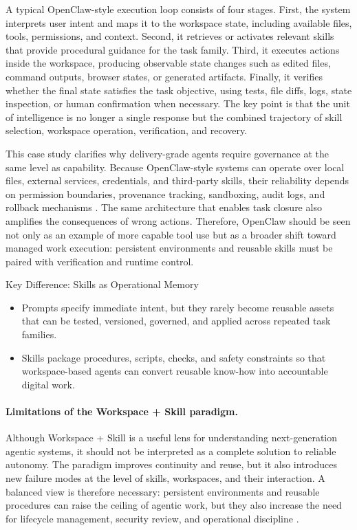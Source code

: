 A typical OpenClaw-style execution loop consists of four stages.
First, the system interprets user intent and maps it to the workspace state, including available files, tools, permissions, and context.
Second, it retrieves or activates relevant skills that provide procedural guidance for the task family.
Third, it executes actions inside the workspace, producing observable state changes such as edited files, command outputs, browser states, or generated artifacts.
Finally, it verifies whether the final state satisfies the task objective, using tests, file diffs, logs, state inspection, or human confirmation when necessary.
The key point is that the unit of intelligence is no longer a single response but the combined trajectory of skill selection, workspace operation, verification, and recovery.

This case study clarifies why delivery-grade agents require governance at the same level as capability.
Because OpenClaw-style systems can operate over local files, external services, credentials, and third-party skills, their reliability depends on permission boundaries, provenance tracking, sandboxing, audit logs, and rollback mechanisms \cite{li2026prism,zhao2026clawguard,gruber2026agenticforensics}.
The same architecture that enables task closure also amplifies the consequences of wrong actions.
Therefore, OpenClaw should be seen not only as an example of more capable tool use but as a broader shift toward managed work execution: persistent environments and reusable skills must be paired with verification and runtime control.

\begin{AIbox}{Key Difference: Skills as Operational Memory}
    \begin{itemize}[left=2pt,topsep=1pt,itemsep=2pt, parsep=1pt]
        \item Prompts specify immediate intent, but they rarely become reusable assets that can be tested, versioned, governed, and applied across repeated task families.

        \item Skills package procedures, scripts, checks, and safety constraints so that workspace-based agents can convert reusable know-how into accountable digital work.
    \end{itemize}
\end{AIbox}

\paragraph{Limitations of the Workspace + Skill paradigm.}
Although Workspace + Skill is a useful lens for understanding next-generation agentic systems, it should not be interpreted as a complete solution to reliable autonomy.
The paradigm improves continuity and reuse, but it also introduces new failure modes at the level of skills, workspaces, and their interaction.
A balanced view is therefore necessary: persistent environments and reusable procedures can raise the ceiling of agentic work, but they also increase the need for lifecycle management, security review, and operational discipline \cite{Pezeshkpour2026FromTS,Li2025SAFEFLOWAP}.

